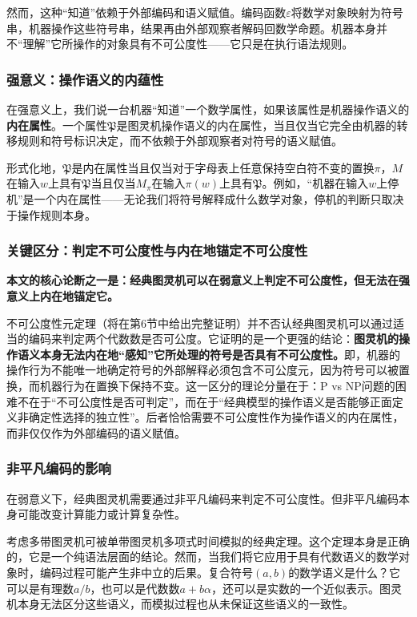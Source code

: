 \documentclass{ctexart}
\begin{document}
	然而，这种``知道''依赖于外部编码和语义赋值。编码函数$\varepsilon$将数学对象映射为符号串，机器操作这些符号串，结果再由外部观察者解码回数学命题。机器本身并不``理解''它所操作的对象具有不可公度性——它只是在执行语法规则。
	
	\subsubsection{强意义：操作语义的内蕴性}
	
	在强意义上，我们说一台机器``知道''一个数学属性，如果该属性是机器操作语义的\textbf{内在属性}。一个属性$\mathfrak{P}$是图灵机操作语义的内在属性，当且仅当它完全由机器的转移规则和符号标识决定，而不依赖于外部观察者对符号的语义赋值。
	
	形式化地，$\mathfrak{P}$是内在属性当且仅当对于字母表上任意保持空白符不变的置换$\pi$，$M$在输入$w$上具有$\mathfrak{P}$当且仅当$M_\pi$在输入$\pi(w)$上具有$\mathfrak{P}$。例如，``机器在输入$w$上停机''是一个内在属性——无论我们将符号解释成什么数学对象，停机的判断只取决于操作规则本身。
	
	\subsubsection{关键区分：判定不可公度性与内在地锚定不可公度性}
	
	\textbf{本文的核心论断之一是：经典图灵机可以在弱意义上判定不可公度性，但无法在强意义上内在地锚定它。}
	
	不可公度性元定理（将在第6节中给出完整证明）并不否认经典图灵机可以通过适当的编码来判定两个代数数是否可公度。它证明的是一个更强的结论：\textbf{图灵机的操作语义本身无法内在地``感知''它所处理的符号是否具有不可公度性。}即，机器的操作行为不能唯一地确定符号的外部解释必须包含不可公度元，因为符号可以被置换，而机器行为在置换下保持不变。这一区分的理论分量在于：P vs NP问题的困难不在于``不可公度性是否可判定''，而在于``经典模型的操作语义是否能够正面定义非确定性选择的独立性''。后者恰恰需要不可公度性作为操作语义的内在属性，而非仅仅作为外部编码的语义赋值。
	
	\subsubsection{非平凡编码的影响}
	
	在弱意义下，经典图灵机需要通过非平凡编码来判定不可公度性。但非平凡编码本身可能改变计算能力或计算复杂性。
	
	考虑多带图灵机可被单带图灵机多项式时间模拟的经典定理。这个定理本身是正确的，它是一个纯语法层面的结论。然而，当我们将它应用于具有代数语义的数学对象时，编码过程可能产生非中立的后果。复合符号$(a, b)$的数学语义是什么？它可以是有理数$a/b$，也可以是代数数$a + b\alpha$，还可以是实数的一个近似表示。图灵机本身无法区分这些语义，而模拟过程也从未保证这些语义的一致性。
	
\end{document}
